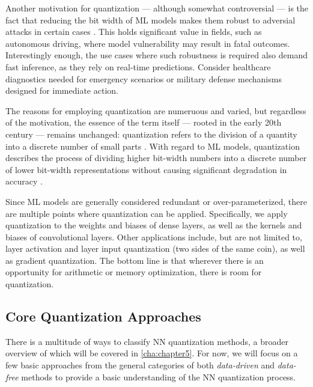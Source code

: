 Another motivation for quantization — although somewhat controversial — is the fact that reducing the bit width of
ML models makes them robust to adversial attacks in certain cases \cite{DBLP:journals/corr/abs-2404-05639}.
This holds significant value in fields, such as autonomous driving,
where model vulnerability may result in fatal outcomes.
Interestingly enough, the use cases where such robustness is required also demand fast inference, 
as they rely on real-time predictions. Consider healthcare diagnostics needed for emergency scenarios 
or military defense mechanisms designed for immediate action.

The reasons for employing quantization are numeruous and varied, but regardless of the motivation,
the essence of the term itself — rooted in the early 20th century — remains unchanged:
quantization refers to the division of a quantity into a discrete number
of small parts \cite{gray1998quantization}. With regard to ML models, 
quantization describes the process of dividing higher bit-width numbers into a discrete number of lower bit-width representations
without causing significant degradation in accuracy \cite{gholami2021survey}.

Since ML models are generally considered redundant or over-parameterized,
there are multiple points where quantization can be applied.
Specifically, we apply quantization to the weights and biases of dense layers, 
as well as the kernels and biases of convolutional layers. 
Other applications include, but are not limited to, layer activation and layer input quantization (two sides of the same coin),
as well as gradient quantization. The bottom line is that wherever there is an opportunity for arithmetic or memory optimization,
there is room for quantization.


\subsection{Core Quantization Approaches}
\label{subsec:commonquantizationapproaches}
\hspace*{1em}There is a multitude of ways to classify NN quantization methods, a broader overview of which will be covered
in \cref{cha:chapter5}.
For now, we will focus on a few basic approaches from the general categories of both 
\textit{data-driven} and \textit{data-free} methods \cite{Edouard2022SPIQ} to provide a basic understanding of the NN quantization process.

